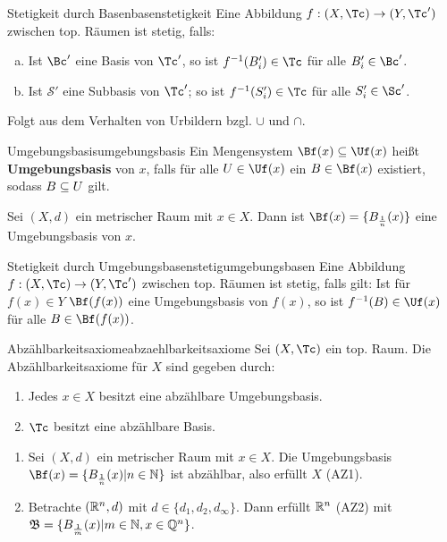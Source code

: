 \begin{satz}{Stetigkeit durch Basen}{basenstetigkeit}
Eine Abbildung $f: (X, \Tc) \to (Y, \Tc')$ zwischen top. Räumen ist stetig, falls:
\begin{enumerate}[(a)]
\item Ist $\Bc'$ eine Basis von $\Tc'$, so  ist $f^{-1}(B_i') \in \Tc$ für alle $B_i' \in \Bc'$.
\item Ist $\mathcal{S}'$ eine Subbasis von $\Tc'$; so ist $f^{-1} (S_i') \in \Tc$ für alle $S_i'\in \Sc'$.
\end{enumerate}
\end{satz}
\begin{beweis}
Folgt aus dem Verhalten von Urbildern bzgl. $\cup$ und $\cap$.
\end{beweis}
\begin{definition}{Umgebungsbasis}{umgebungsbasis}
Ein Mengensystem $\Bf (x) \sub \Uf (x)$ heißt \textbf{Umgebungsbasis} von $x$, falls für alle $U \in \Uf (x)$ ein $B \in \Bf (x)$ existiert, sodass $B \subseteq U$ gilt.
\end{definition}
\begin{beispiel}
Sei $(X,d)$ ein metrischer Raum mit $x \in X$. Dann ist $\Bf (x) = \{B_{\frac{1}{n}}(x) \}$ eine Umgebungsbasis von $x$.
\end{beispiel}
\begin{satz}{Stetigkeit durch Umgebungsbasen}{stetigumgebungsbasen}
Eine Abbildung $f: (X, \Tc) \to (Y, \Tc')$ zwischen top. Räumen ist stetig, falls gilt:
Ist für $f(x) \in Y$ $\Bf (f(x))$ eine Umgebungsbasis von $f(x)$, so ist $f^{-1}(B) \in \Uf (x)$ für alle $B \in \Bf (f(x))$.
\end{satz}
\begin{definition}{Abzählbarkeitsaxiome}{abzaehlbarkeitsaxiome}
Sei $(X,\Tc)$ ein top. Raum. Die Abzählbarkeitsaxiome für $X$ sind gegeben durch:
\begin{enumerate}[({AZ}1)]
\item Jedes $x \in X$ besitzt eine abzählbare Umgebungsbasis.
\item $\Tc$ besitzt eine abzählbare Basis.
\end{enumerate}
\end{definition}
\begin{beispiele}
\begin{enumerate}
\item Sei $(X,d)$ ein metrischer Raum mit $x \in X$. Die Umgebungsbasis $\Bf (x) = \{B_{\frac{1}{n}}(x)|n \in \N\}$ ist abzählbar, also erfüllt $X$ (AZ1).
\item Betrachte $(\mathbb{R}^n, d)$ mit $d \in  \{d_1,d_2,d_\infty\}$. Dann erfüllt $\mathbb{R}^n$ (AZ2) mit $\mathfrak{B} = \{B_{\frac{1}{m}}(x)| m\in \mathbb{N}, x \in \mathbb{Q}^n \}$.
\end{enumerate}
\end{beispiele}
